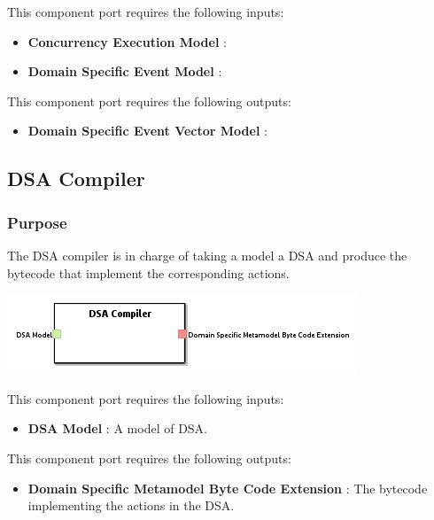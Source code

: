 \documentclass{gemoc} %
\begin{document}
This component port requires the following inputs:
\begin{itemize}
  \item \textbf{Concurrency Execution Model} :
  \item \textbf{Domain Specific Event Model} :
\end{itemize}

This component port requires the following outputs:
\begin{itemize}
  \item \textbf{Domain Specific Event Vector Model} :
\end{itemize}

\subsection{DSA Compiler}

\subsubsection{Purpose}
The DSA compiler is in charge of taking a model a DSA and produce the bytecode that implement the corresponding actions.

\begin{center}
\includegraphics*[trim=0.0cm 0.0cm 0cm 0.0cm, clip=true]{../images/generated/Generated_DSA_Compiler.png}
\end{center}

This component port requires the following inputs:
\begin{itemize}
  \item \textbf{DSA Model} :
A model of DSA.
\end{itemize}

This component port requires the following outputs:
\begin{itemize}
  \item \textbf{Domain Specific Metamodel Byte Code Extension} :
The bytecode implementing the actions in the DSA.
\end{itemize}
\end{document}
